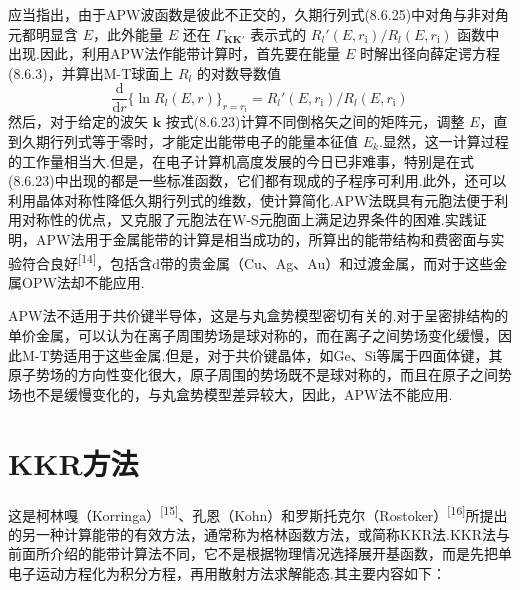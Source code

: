 应当指出，由于APW波函数是彼此不正交的，久期行列式(8.6.25)中对角与非对角元都明显含 $E$，此外能量 $E$ 还在 $\Gamma_{\boldsymbol{K}\boldsymbol{K}'}$ 表示式的 $R_{l}'(E,r_{\mathrm{i}})/R_{l}(E,r_{\mathrm{i}})$ 函数中出现.因此，利用APW法作能带计算时，首先要在能量 $E$ 时解出径向薛定谔方程(8.6.3)，并算出M-T球面上 $R_{l}$ 的对数导数值
\begin{equation*}
  \frac{\mathrm{d}}{\mathrm{d}r}\bigl\{\ln R_{l}(E,r)\bigr\}_{r=r_{\mathrm{i}}}=R_{l}'(E,r_{\mathrm{i}})/R_{l}(E,r_{\mathrm{i}})
\end{equation*}
然后，对于给定的波矢 $\boldsymbol{k}$ 按式(8.6.23)计算不同倒格矢之间的矩阵元，调整 $E$，直到久期行列式等于零时，才能定出能带电子的能量本征值 $E_{k}$.显然，这一计算过程的工作量相当大.但是，在电子计算机高度发展的今日已非难事，特别是在式(8.6.23)中出现的都是一些标准函数，它们都有现成的子程序可利用.此外，还可以利用晶体对称性降低久期行列式的维数，使计算简化.APW法既具有元胞法便于利用对称性的优点，又克服了元胞法在W-S元胞面上满足边界条件的困难.实践证明，APW法用于金属能带的计算是相当成功的，所算出的能带结构和费密面与实验符合良好\textsuperscript{[14]}，包括含d带的贵金属（Cu、Ag、Au）和过渡金属，而对于这些金属OPW法却不能应用.

APW法不适用于共价键半导体，这是与丸盒势模型密切有关的.对于呈密排结构的单价金属，可以认为在离子周围势场是球对称的，而在离子之间势场变化缓慢，因此M-T势适用于这些金属.但是，对于共价键晶体，如Ge、Si等属于四面体键，其原子势场的方向性变化很大，原子周围的势场既不是球对称的，而且在原子之间势场也不是缓慢变化的，与丸盒势模型差异较大，因此，APW法不能应用.
\section{KKR方法}

这是柯林嘎（Korringa）\textsuperscript{[15]}、孔恩（Kohn）和罗斯托克尔（Rostoker）\textsuperscript{[16]}所提出的另一种计算能带的有效方法，通常称为格林函数方法，或简称KKR法.KKR法与前面所介绍的能带计算法不同，它不是根据物理情况选择展开基函数，而是先把单电子运动方程化为积分方程，再用散射方法求解能态.其主要内容如下：

